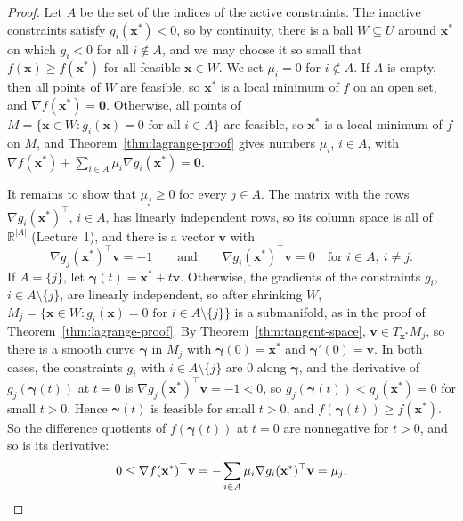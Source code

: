 \documentclass[11pt]{article}
\theoremstyle{definition}
\theoremstyle{plain}
\theoremstyle{remark}
\begin{document}
\begin{proof}
    Let $A$ be the set of the indices of the active constraints. The inactive constraints satisfy $g_i(\mathbf{x}^*) < 0$, so by continuity, there is a ball $W \subseteq U$ around $\mathbf{x}^*$ on which $g_i < 0$ for all $i \notin A$, and we may choose it so small that $f(\mathbf{x}) \geq f(\mathbf{x}^*)$ for all feasible $\mathbf{x} \in W$. We set $\mu_i = 0$ for $i \notin A$. If $A$ is empty, then all points of $W$ are feasible, so $\mathbf{x}^*$ is a local minimum of $f$ on an open set, and $\nabla f(\mathbf{x}^*) = \mathbf{0}$. Otherwise, all points of $M = \{\mathbf{x} \in W : g_i(\mathbf{x}) = 0 \text{ for all } i \in A\}$ are feasible, so $\mathbf{x}^*$ is a local minimum of $f$ on $M$, and Theorem~\ref{thm:lagrange-proof} gives numbers $\mu_i$, $i \in A$, with $\nabla f(\mathbf{x}^*) + \sum_{i \in A} \mu_i\nabla g_i(\mathbf{x}^*) = \mathbf{0}$.

    It remains to show that $\mu_j \geq 0$ for every $j \in A$. The matrix with the rows $\nabla g_i(\mathbf{x}^*)^\top$, $i \in A$, has linearly independent rows, so its column space is all of $\mathbb{R}^{|A|}$ (Lecture~1), and there is a vector $\mathbf{v}$ with
    \[\nabla g_j(\mathbf{x}^*)^\top\mathbf{v} = -1 \qquad \text{and} \qquad \nabla g_i(\mathbf{x}^*)^\top\mathbf{v} = 0 \quad \text{for } i \in A, \ i \neq j.\]
    If $A = \{j\}$, let $\boldsymbol{\gamma}(t) = \mathbf{x}^* + t\mathbf{v}$. Otherwise, the gradients of the constraints $g_i$, $i \in A \setminus \{j\}$, are linearly independent, so after shrinking $W$, $M_j = \{\mathbf{x} \in W : g_i(\mathbf{x}) = 0 \text{ for } i \in A \setminus \{j\}\}$ is a submanifold, as in the proof of Theorem~\ref{thm:lagrange-proof}. By Theorem~\ref{thm:tangent-space}, $\mathbf{v} \in T_{\mathbf{x}^*}M_j$, so there is a smooth curve $\boldsymbol{\gamma}$ in $M_j$ with $\boldsymbol{\gamma}(0) = \mathbf{x}^*$ and $\boldsymbol{\gamma}'(0) = \mathbf{v}$. In both cases, the constraints $g_i$ with $i \in A \setminus \{j\}$ are $0$ along $\boldsymbol{\gamma}$, and the derivative of $g_j(\boldsymbol{\gamma}(t))$ at $t = 0$ is $\nabla g_j(\mathbf{x}^*)^\top\mathbf{v} = -1 < 0$, so $g_j(\boldsymbol{\gamma}(t)) < g_j(\mathbf{x}^*) = 0$ for small $t > 0$. Hence $\boldsymbol{\gamma}(t)$ is feasible for small $t > 0$, and $f(\boldsymbol{\gamma}(t)) \geq f(\mathbf{x}^*)$. So the difference quotients of $f(\boldsymbol{\gamma}(t))$ at $t = 0$ are nonnegative for $t > 0$, and so is its derivative:
    \[0 \leq \nabla f(\mathbf{x}^*)^\top\mathbf{v} = -\sum_{i \in A} \mu_i\nabla g_i(\mathbf{x}^*)^\top\mathbf{v} = \mu_j. \qedhere\]
\end{proof}
\end{document}
